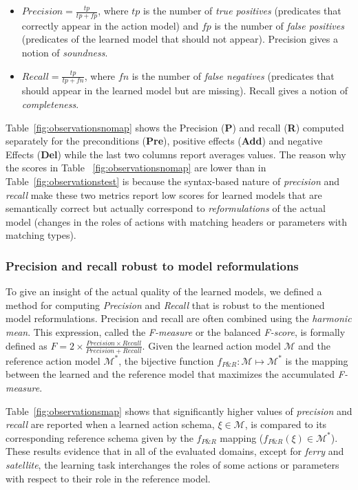 \documentclass{article}
\begin{document}
\begin{itemize}
\item $Precision=\frac{tp}{tp+fp}$, where $tp$ is the number of {\em true positives} (predicates that correctly appear in the action model) and $fp$ is the number of {\em false positives} (predicates of the learned model that should not appear). Precision gives a notion of {\em soundness}.
\item $Recall=\frac{tp}{tp+fn}$, where $fn$ is the number of {\em false negatives} (predicates that should appear in the learned model but are missing). Recall gives a notion of {\em completeness}.
\end{itemize}

Table~\ref{fig:observationsnomap} shows the Precision ({\bf P}) and recall ({\bf R}) computed separately for the preconditions ({\bf Pre}), positive effects ({\bf Add}) and negative Effects ({\bf Del}) while the last two columns report averages values. The reason why the scores in Table ~\ref{fig:observationsnomap} are lower than in Table~\ref{fig:observationstest} is because the syntax-based nature of {\em precision} and {\em recall} make these two metrics report low scores for learned models that are semantically correct but actually correspond to {\em reformulations} of the actual model (changes in the roles of actions with matching headers or parameters with matching types).


\subsubsection{Precision and recall robust to model reformulations}

To give an insight of the actual quality of the learned models, we defined a method for computing {\em Precision} and {\em Recall} that is robust to the mentioned model reformulations. Precision and recall are often combined using the {\em harmonic mean}. This expression, called the {\em F-measure} or the balanced {\em F-score}, is formally defined as $F=2\times\frac{Precision\times Recall}{Precision+Recall}$. Given the learned action model $\mathcal{M}$ and the reference action model $\mathcal{M}^*$, the bijective function $f_{P\&R}:\mathcal{M} \mapsto \mathcal{M}^*$ is the mapping between the learned and the reference model that maximizes the accumulated {\em F-measure}.

Table~\ref{fig:observationsmap} shows that significantly higher values of {\em precision} and {\em recall} are reported when a learned action schema, $\xi\in\mathcal{M}$, is compared to its corresponding reference schema given by the $f_{P\&R}$ mapping ($f_{P\&R}(\xi)\in \mathcal{M}^*$). These results evidence that in all of the evaluated domains, except for {\em ferry} and {\em satellite}, the learning task interchanges the roles of some actions or parameters with respect to their role in the reference model.
\end{document}
